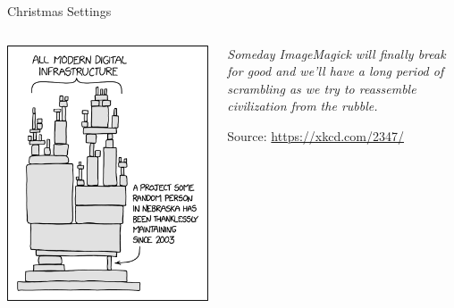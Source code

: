
\begin{frame}[t,plain]
\titlepage
\end{frame}


\begin{frame}{Christmas Settings}
%
\begin{columns}[T]
\vspace{-12pt}
\begin{center}
	\includegraphics[width=.7\linewidth]{./gfx/11-xkcd-dependency}
\end{center}
%
\vspace{+40pt}
\begin{center}
	\emph{Someday ImageMagick will finally break for good and we'll have a long period of scrambling as we try to reassemble civilization from the rubble.}
	
	\vspace{12pt}
	Source: \url{https://xkcd.com/2347/}
\end{center}
\end{columns}
%
\end{frame}


